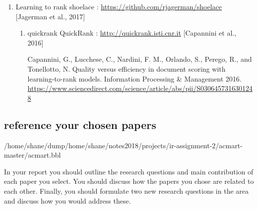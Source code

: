\documentclass[11pt]{article}
\begin{document}
\begin{enumerate}
\item Learning to rank
\label{sec:org5cdbe41}
shoelace : \url{https://github.com/rjagerman/shoelace} [Jagerman et al., 2017]

\begin{enumerate}
\item quickrank
\label{sec:org5177965}
QuickRank : \url{http://quickrank.isti.cnr.it} [Capannini et al., 2016]

Capannini, G., Lucchese, C., Nardini, F. M., Orlando, S., Perego, R., and Tonellotto, N. Quality versus efficiency in document scoring with learning-to-rank models. Information Processing \& Management 2016.
\url{https://www.sciencedirect.com/science/article/abs/pii/S0306457316301248}
\end{enumerate}
\end{enumerate}


\subsection{reference your chosen papers}
\label{sec:org1e746ec}
/home/shane/dump/home/shane/notes2018/projects/ir-assignment-2/acmart-master/acmart.bbl

In your report you should outline the research questions and main contribution of each paper you
select. You should discuss how the papers you chose are related to each other. Finally, you should
formulate two new research questions in the area and discuss how you would address these.




\end{document}
